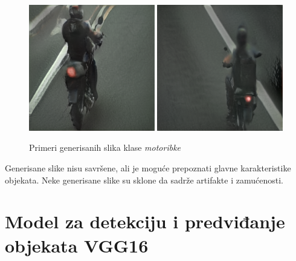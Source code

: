 \documentclass[12pt,oneside]{memoir}
\begin{document}
\begin{figure}[!htbp]
\centering
    \includegraphics[width=0.49\textwidth]{matfmaster/stylegan/motorbike/image2.png}
    \includegraphics[width=0.49\textwidth]{matfmaster/stylegan/motorbike/image9.png}
\caption{Primeri generisanih slika klase \textit{motoribke}}
\label{fig:section4_stylegan_motorbike_images}
\end{figure}

Generisane slike nisu savršene, ali je moguće prepoznati glavne karakteristike objekata. Neke generisane slike su sklone da sadrže artifakte i zamućenosti.


\section{Model za detekciju i predviđanje objekata VGG16}
\end{document}
